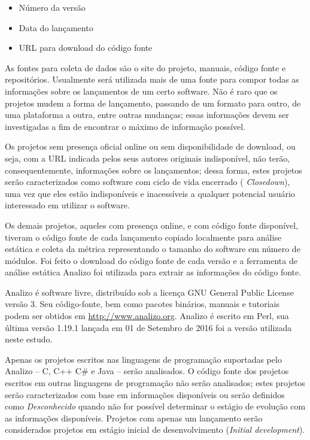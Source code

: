 \begin{itemize}
  \item Número da versão
  \item Data do lançamento
  \item URL para download do código fonte
\end{itemize}

As fontes para coleta de dados são o site do projeto, manuais, código fonte e
repositórios. Usualmente será utilizada mais de uma fonte para compor todas as
informações sobre os lançamentos de um certo software. Não é raro que os
projetos mudem a forma de lançamento, passando de um formato para outro, de uma
plataforma a outra, entre outras mudanças; essas informações devem ser
investigadas a fim de encontrar o máximo de informação possível.

Os projetos sem presença oficial online ou sem disponibilidade de download, ou
seja, com a URL indicada pelos seus autores originais indisponível,
não terão, consequentemente, informações sobre os lançamentos; dessa forma, estes
projetos serão caracterizados como software com ciclo de vida encerrado ({\it
Closedown}), uma vez que eles estão indisponíveis e inacessíveis a qualquer
potencial usuário interessado em utilizar o software.

Os demais projetos, aqueles com presença online, e com código fonte disponível,
tiveram o código fonte de cada lançamento copiado localmente para análise
estática e coleta da métrica representando o tamanho do software em número de
módulos. Foi feito o download do código fonte de cada versão e a ferramenta de
análise estática Analizo foi utilizada para extrair as informações do código
fonte.

Analizo é software livre, distribuído sob a licença GNU General Public License
versão 3. Seu código-fonte, bem como pacotes binários, manuais e tutoriais
podem ser obtidos em \url{http://www.analizo.org}. Analizo é escrito em Perl,
sua última versão 1.19.1 lançada em 01 de Setembro de 2016 foi a versão
utilizada neste estudo.

Apenas os projetos escritos nas linguagens de programação suportadas pelo Analizo 
-- C, C++ C\# e Java -- serão analisados.
O código fonte dos projetos escritos em
outras linguagens de programação não serão analisados; 
estes projetos serão caracterizados com base em informações disponíveis ou 
serão definidos como {\it Desconhecido} quando não for possível determinar 
o estágio de evolução com as informações disponíveis. Projetos com apenas um
lançamento serão considerados projetos em estágio inicial de desenvolvimento
({\it Initial development}).

